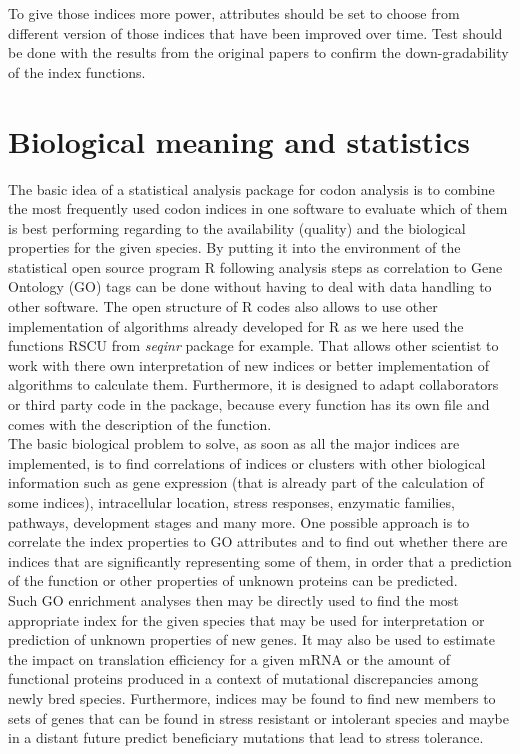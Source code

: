 To give those indices more power, attributes should be set to choose from different version of those indices that have been improved over time. Test should be done with the results from the original papers to confirm the down-gradability of the index functions.


\section{Biological meaning and statistics}
The basic idea of a statistical analysis package for codon analysis is to combine the most frequently used codon indices in one software to evaluate which of them is best performing regarding to the availability (quality) and the biological properties for the given species. By putting it into the environment of the statistical open source program R following analysis steps as correlation to Gene Ontology (GO) tags can be done without having to deal with data handling to other software. The open structure of R codes also allows to use other implementation of algorithms already developed for R as we here used the functions RSCU from \textit{seqinr} package for example. That allows other scientist to work with there own interpretation of new indices or better implementation of algorithms to calculate them. Furthermore, it is designed to adapt collaborators or third party code in the package, because every function has its own file and comes with the description of the function.\\
The basic biological problem to solve, as soon as all the major indices are implemented, is to find correlations of indices or clusters with other biological information such as gene expression (that is already part of the calculation of some indices), intracellular location, stress responses, enzymatic families, pathways, development stages and many more. One possible approach is to correlate the index properties to GO attributes and to find out whether there are indices that are significantly representing some of them, in order that a prediction of the function or other properties of unknown proteins can be predicted.\\

Such GO enrichment analyses then may be directly used to find the most appropriate index for the given species that may be used for interpretation or prediction of unknown properties of new genes. It may also be used to estimate the impact on translation efficiency for a given mRNA or the amount of functional proteins produced in a context of mutational discrepancies among newly bred species. Furthermore, indices may be found to find new members to sets of genes that can be found in stress resistant or intolerant species and maybe in a distant future predict beneficiary mutations that lead to stress tolerance. \\

